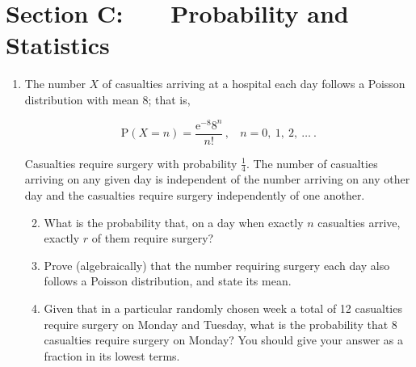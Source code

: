\documentclass[a4, 11pt]{report}
\newlength{\qspace}
\newcounter{qnumber}
\newenvironment{question}%
 {\vspace{\qspace}
  \begin{enumerate}[\bfseries 1\quad][10]%
    \setcounter{enumi}{\value{qnumber}}%
    \item%
 }
{
  \end{enumerate}
  \filbreak
  \stepcounter{qnumber}
 }
\newenvironment{questionparts}[1][1]%
 {
  \begin{enumerate}[\bfseries (i)]%
    \setcounter{enumii}{#1}
    \addtocounter{enumii}{-1}
    \setlength{\itemsep}{5mm}
    \setlength{\parskip}{8pt}
 }
 {
  \end{enumerate}
 }
\def\e{{\mathrm e}}
\def\P{{\mathrm P}}
\renewcommand{\.}[1]{\ensuremath{\mathrm{#1}}}
\newcommand{\+}[1]{\ensuremath{\mathbf{#1}}}
\begin{document}
	
	\newpage
\section*{Section C: \ \ \ Probability and Statistics}


\begin{question}
The number $X$ of casualties arriving at a hospital each day  follows a Poisson distribution with mean 8; that is,

\[
\P(X=n) = \frac{ \e^{-8}8^n}{n!}\,,
\ \ \ \  n=0, \ 1, \ 2, \ \ldots \ .
\]

Casualties require surgery with probability $\frac14$. The number of casualties arriving on any given day is independent of the number arriving on any other day and the casualties require surgery  independently of one another.

\begin{questionparts}

\item What is the probability that, on a day when exactly $n$ casualties arrive, exactly $r$ of them require surgery?
\item Prove (algebraically) that the number requiring surgery each day also follows a Poisson distribution, and state its mean.
\item Given that in a particular randomly chosen week a total of 12 casualties require surgery on Monday and Tuesday,  what is the  probability that 8 casualties require surgery on Monday? You should give your answer as a fraction in its lowest terms.
\end{questionparts}
\end{question}
\end{document}
